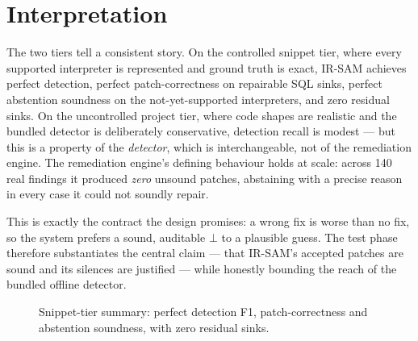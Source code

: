 \documentclass[11pt,a4paper]{article}
\newcommand{\bottom}{\ensuremath{\bot}}
\newcommand{\irsam}{\mbox{IR\nobreakdash-SAM}}
\begin{document}
\section{Interpretation}
\label{sec:interpretation}
The two tiers tell a consistent story. On the controlled snippet tier,
where every supported interpreter is represented and ground truth is
exact, \irsam{} achieves perfect detection, perfect patch-correctness on
repairable SQL sinks, perfect abstention soundness on the
not-yet-supported interpreters, and zero residual sinks. On the
uncontrolled project tier, where code shapes are realistic and the
bundled detector is deliberately conservative, detection recall is
modest --- but this is a property of the \emph{detector}, which is
interchangeable, not of the remediation engine. The remediation engine's
defining behaviour holds at scale: across 140 real findings it produced
\emph{zero} unsound patches, abstaining with a precise reason in every
case it could not soundly repair.

This is exactly the contract the design promises: a wrong fix is worse
than no fix, so the system prefers a sound, auditable \bottom{} to a
plausible guess. The test phase therefore substantiates the central
claim --- that \irsam{}'s accepted patches are sound and its silences are
justified --- while honestly bounding the reach of the bundled offline
detector.

\begin{figure}[h]
\centering
{}
\caption{Snippet-tier summary: perfect detection F1, patch-correctness and
abstention soundness, with zero residual sinks.}
\label{fig:snippet-summary}
\end{figure}
\end{document}
